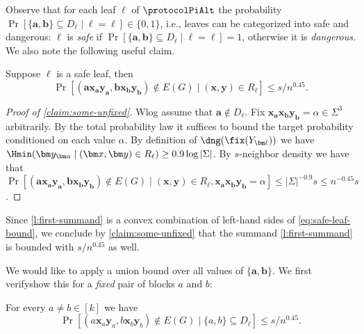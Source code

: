 Observe that for each leaf $\ell$ of $\protocolPiAlt$ the probability $\Pr[\{\bm a, \bm b\} \subseteq D_{\ell} \mid \bm \ell = \ell] \in \{0,1\}$, i.e., leaves can be categorized into safe and dangerous: $\ell$ is \emph{safe} if $\Pr[\{\bm a, \bm b\} \subseteq D_{\bm \ell} \mid \bm \ell = \ell] = 1$, otherwise it is \emph{dangerous}. We also note the following useful claim.


\begin{claim}\label{claim:some-unfixed}
Suppose $\ell$ is a safe leaf, then
        \begin{equation}
            \Pr[(\bm a \bm x_{\bm a} \bm y_{\bm a}, \bm b \bm x_{\bm b} \bm y_{\bm b}) \not\in E(G)  \mid (\bm x, \bm y) \in R_\ell] \le s/n^{0.45}. \label{eq:safe-leaf-bound}
        \end{equation}
\end{claim}

{}{
\begin{proof}[Proof of \autoref{claim:some-unfixed}]
Wlog assume that $\bm a \notin D_{\bm \ell}$. Fix $\bm x_{\bm a} \bm x_{\bm b} \bm y_{\bm b} = \alpha \in \Sigma^3$ arbitrarily. By the total probability law it suffices to bound the target probability conditioned on each value $\alpha$. By definition of $\dng(\fix(Y_{\bm \ell}))$ we have  $\Hmin(\bm y_{\bm a} \mid (\bm x, \bm y) \in R_\ell) \ge 0.9 \log |\Sigma|$. By $s$-neighbor density we have that $\Pr[(\bm a \bm x_{\bm a}\bm y_{\bm a}, \bm b \bm x_{\bm b} \bm y_{\bm b}) \not\in E(G) \mid (\bm x, \bm y) \in R_\ell, \bm x_{\bm a}\bm x_{\bm b} \bm y_{\bm b} = \alpha] \le |\Sigma|^{-0.9} s \le n^{-0.45} s$. 
\end{proof}
}

Since \eqref{l:first-summand} is a convex combination of left-hand sides of \eqref{eq:safe-leaf-bound}, we conclude by \cref{claim:some-unfixed} that the summand \eqref{l:first-summand} is bounded with $s/n^{0.45}$ as well.


 We would like to apply a union bound over all values of $\{\bm a, \bm b\}$. We first 
{verify}{show} this for a \emph{fixed} pair of blocks $a$ and $b$:
\begin{claim} 
\label{claim:all-fixed}
    For every $a \neq b \in [k]$ we have
    \[\Pr[(a \bm x_a \bm y_a, b \bm x_b \bm y_b) \not\in E(G) \mid \{a,b\} \subseteq D_{\bm \ell}] \le s/n^{0.45}.\]
\end{claim}

